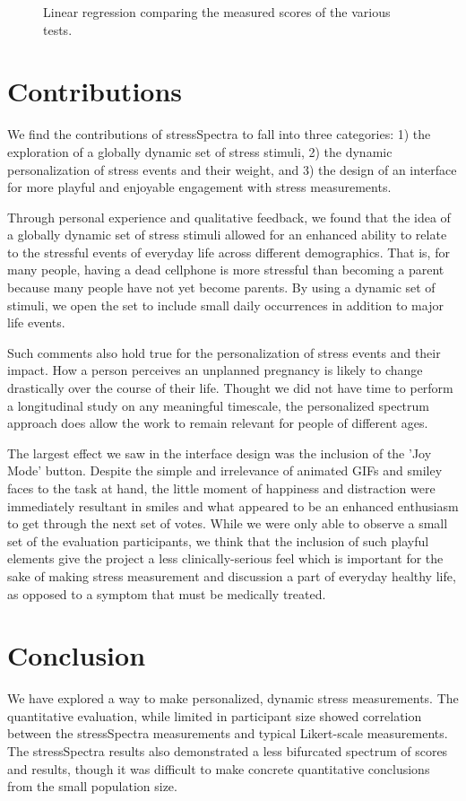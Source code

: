 \documentclass{sigchi}
\begin{document}
\begin{figure}[h!]
\caption{Linear regression comparing the measured scores of the various tests.}
\label{fig:evalreg}
\end{figure}





\section{Contributions}
We find the contributions of stressSpectra to fall into three categories: 1) the exploration of a globally dynamic set of stress stimuli, 2) the dynamic personalization of stress events and their weight, and 3) the design of an interface for more playful and enjoyable engagement with stress measurements.

Through personal experience and qualitative feedback, we found that the idea of a globally dynamic set of stress stimuli allowed for an enhanced ability to relate to the stressful events of everyday life across different demographics. That is, for many people, having a dead cellphone is more stressful than becoming a parent because many people have not yet become parents. By using a dynamic set of stimuli, we open the set to include small daily occurrences in addition to major life events. 

Such comments also hold true for the personalization of stress events and their impact. How a person perceives an unplanned pregnancy is likely to change drastically over the course of their life. Thought we did not have time to perform a longitudinal study on any meaningful timescale, the personalized spectrum approach does allow the work to remain relevant for people of different ages. 

The largest effect we saw in the interface design was the inclusion of the 'Joy Mode' button. Despite the simple and irrelevance of animated GIFs and smiley faces to the task at hand, the little moment of happiness and distraction were immediately resultant in smiles and what appeared to be an enhanced enthusiasm to get through the next set of votes. While we were only able to observe a small set of the evaluation participants, we think that the inclusion of such playful elements give the project a less clinically-serious feel which is important for the sake of making stress measurement and discussion a part of everyday healthy life, as opposed to a symptom that must be medically treated. 

\section{Conclusion}
We have explored a way to make personalized, dynamic stress measurements. The quantitative evaluation, while limited in participant size showed correlation between the stressSpectra measurements and typical Likert-scale measurements. The stressSpectra results also demonstrated a less bifurcated spectrum of scores and results, though it was difficult to make concrete quantitative conclusions from the small population size.
\end{document}
